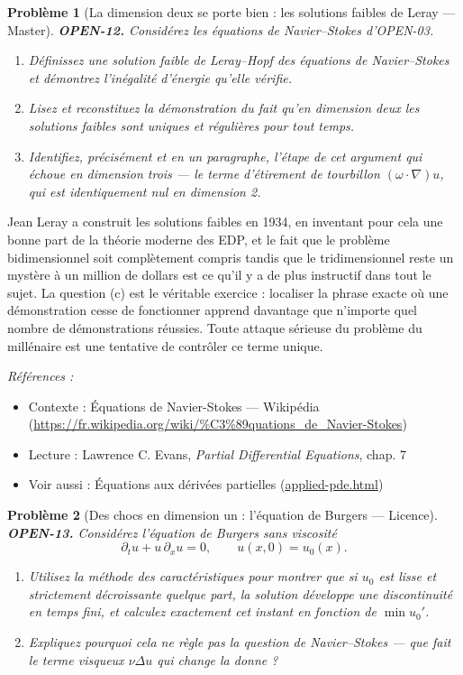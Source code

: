 \documentclass[11pt]{article}
\newtheorem{problem}{Problème}
\newenvironment{refs}{\par\small\noindent\emph{Références :}\begin{itemize}\setlength\itemsep{0pt}}{\end{itemize}\normalsize}
\begin{document}
\begin{problem}[{La dimension deux se porte bien : les solutions faibles de Leray --- Master}]
\textbf{OPEN-12.} Considérez les équations de Navier--Stokes d'OPEN-03.
\begin{enumerate}
\item[(a)] Définissez une solution faible de Leray--Hopf des équations de Navier--Stokes et
démontrez l'inégalité d'énergie qu'elle vérifie.
\item[(b)] Lisez et reconstituez la démonstration du fait qu'en dimension \textit{deux} les
solutions faibles sont uniques et régulières pour tout temps.
\item[(c)] Identifiez, précisément et en un paragraphe, l'étape de cet argument qui échoue en
dimension trois --- le terme d'étirement de tourbillon $ (\omega \cdot \nabla) u $, qui
est identiquement nul en dimension 2.
\end{enumerate}

\end{problem}

\noindent Jean Leray a construit les solutions faibles en 1934, en inventant pour
cela une bonne part de la théorie moderne des EDP, et le fait que le problème
bidimensionnel soit complètement compris tandis que le tridimensionnel reste un mystère à
un million de dollars est ce qu'il y a de plus instructif dans tout le sujet. La question (c)
est le véritable exercice : localiser la phrase exacte où une démonstration cesse de
fonctionner apprend davantage que n'importe quel nombre de démonstrations réussies. Toute
attaque sérieuse du problème du millénaire est une tentative de contrôler ce terme unique.

\begin{refs}
\item Contexte : Équations de Navier-Stokes --- Wikipédia (\url{https://fr.wikipedia.org/wiki/%C3%89quations_de_Navier-Stokes})
\item Lecture : Lawrence C. Evans, \textit{Partial Differential Equations}, chap. 7
\item Voir aussi : Équations aux dérivées partielles (\url{applied-pde.html})
\end{refs}

\bigskip

\begin{problem}[{Des chocs en dimension un : l'équation de Burgers --- Licence}]
\textbf{OPEN-13.} Considérez l'équation de Burgers sans viscosité
\[ \partial_t u + u \, \partial_x u = 0, \qquad u(x,0) = u_0(x). \]
\begin{enumerate}
\item[(a)] Utilisez la méthode des caractéristiques pour montrer que si $ u_0 $ est lisse et
strictement décroissante quelque part, la solution développe une discontinuité en temps
fini, et calculez exactement cet instant en fonction de $ \min u_0' $.
\item[(b)] Expliquez pourquoi cela ne règle \textit{pas} la question de Navier--Stokes --- que fait
le terme visqueux $ \nu \Delta u $ qui change la donne ?
\end{enumerate}

\end{problem}
\end{document}

